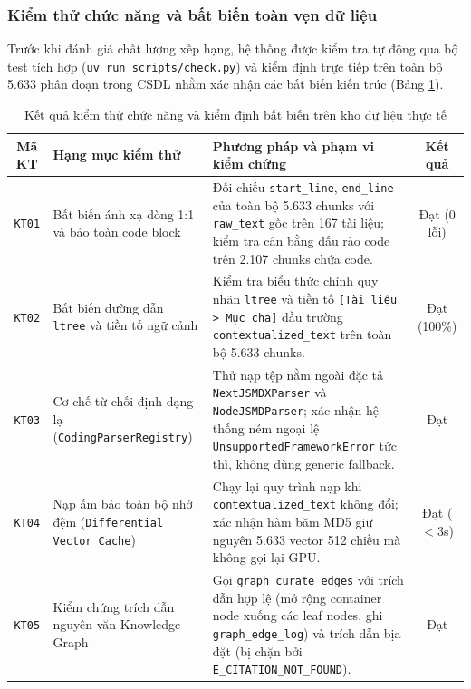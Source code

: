 \subsubsection{Kiểm thử chức năng và bất biến toàn vẹn dữ liệu}
Trước khi đánh giá chất lượng xếp hạng, hệ thống được kiểm tra tự động qua bộ test tích hợp (\texttt{uv run scripts/check.py}) và kiểm định trực tiếp trên toàn bộ 5.633 phân đoạn trong CSDL nhằm xác nhận các bất biến kiến trúc (Bảng \ref{tab:func_tests}).

\begin{table}[H]
\centering
\caption{Kết quả kiểm thử chức năng và kiểm định bất biến trên kho dữ liệu thực tế}
\label{tab:func_tests}
\footnotesize\setlength{\tabcolsep}{4pt}\begin{tabularx}{\textwidth}{c>{\raggedright\arraybackslash}p{4.3cm}>{\raggedright\arraybackslash}Xc}
\toprule
\textbf{Mã KT} & \textbf{Hạng mục kiểm thử} & \textbf{Phương pháp và phạm vi kiểm chứng} & \textbf{Kết quả} \\
\midrule
\texttt{KT01} & Bất biến ánh xạ dòng 1:1 và bảo toàn code block & Đối chiếu \texttt{start\_line}, \texttt{end\_line} của toàn bộ 5.633 chunks với \texttt{raw\_text} gốc trên 167 tài liệu; kiểm tra cân bằng dấu rào code trên 2.107 chunks chứa code. & Đạt (0 lỗi) \\
\addlinespace[2pt]
\texttt{KT02} & Bất biến đường dẫn \texttt{ltree} và tiền tố ngữ cảnh & Kiểm tra biểu thức chính quy nhãn \texttt{ltree} và tiền tố \texttt{[Tài liệu > Mục cha]} đầu trường \texttt{contextualized\_text} trên toàn bộ 5.633 chunks. & Đạt (100\%) \\
\addlinespace[2pt]
\texttt{KT03} & Cơ chế từ chối định dạng lạ (\texttt{CodingParserRegistry}) & Thử nạp tệp nằm ngoài đặc tả \texttt{NextJSMDXParser} và \texttt{NodeJSMDParser}; xác nhận hệ thống ném ngoại lệ \texttt{UnsupportedFrameworkError} tức thì, không dùng generic fallback. & Đạt \\
\addlinespace[2pt]
\texttt{KT04} & Nạp ấm bảo toàn bộ nhớ đệm (\texttt{Differential Vector Cache}) & Chạy lại quy trình nạp khi \texttt{contextualized\_text} không đổi; xác nhận hàm băm MD5 giữ nguyên 5.633 vector 512 chiều mà không gọi lại GPU. & Đạt ($< 3$s) \\
\addlinespace[2pt]
\texttt{KT05} & Kiểm chứng trích dẫn nguyên văn Knowledge Graph & Gọi \texttt{graph\_curate\_edges} với trích dẫn hợp lệ (mở rộng container node xuống các leaf nodes, ghi \texttt{graph\_edge\_log}) và trích dẫn bịa đặt (bị chặn bởi \texttt{E\_CITATION\_NOT\_FOUND}). & Đạt \\

\end{tabularx}
\end{table}
